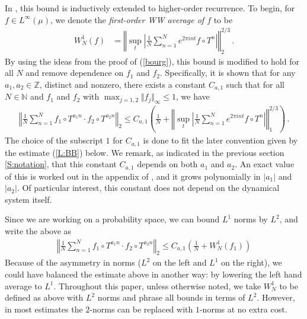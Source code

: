 \documentclass[11pt, oneside]{amsart}   	%
\newcommand{\1}{\mathbbm{1}}
\theoremstyle{definition}
\begin{document}
In \cite{assani2024higherorderwienerwintnersystems}, this bound is inductively extended to higher-order recurrence. To begin, for $f\in L^\infty(\mu)$, we denote the \textit{first-order WW average of $f$} to be
\begin{align*}
W^1_N(f) &= \left\Vert \sup_{t}\left| \frac{1}{N}\sum_{n=1}^N e^{2\pi i n t} f\circ T^n \right| \right\Vert_2^{2/3} \, .
\end{align*}
By using the ideas from the proof of (\ref{bourg}), this bound is modified to hold for all $N$ and remove dependence on $f_1$ and $f_2$. Specifically, it is shown that for any $a_1, a_2\in \mathbb{Z}$, distinct and nonzero, there exists a constant $C_{a, 1}$ such that for all $N\in \mathbb{N}$ and $f_1$ and $f_2$ with $\max_{j=1, 2} \Vert f_j \Vert_{\infty} \leq 1$, we have 
\begin{align*}
\left\Vert \frac{1}{N}\sum_{n=1}^N f_1 \circ T^{a_1n} \cdot f_2 \circ T^{a_2n} \right\Vert_2 \leq C_{a, 1} \left( \frac{1}{N} +\left\Vert\sup_t \left|\frac{1}{N}\sum_{n=1}^N e^{2\pi i n t} f\circ T^n \right| \right\Vert_1^{2/3}\right) \, .
\end{align*}
The choice of the subscript $1$ for $C_{a, 1}$ is done to fit the later convention given by the estimate (\ref{L:BB}) below. We remark, as indicated in the previous section \ref{S:notation}, that this constant $C_{a, 1}$ depends on both $a_1$ and $a_2$. An exact value of this is worked out in the appendix of \cite{assani2024higherorderwienerwintnersystems}, and it grows polynomially in $|a_1|$ and $|a_2|$. Of particular interest, this constant does not depend on the dynamical system itself.    

Since we are working on a probability space, we can bound $L^1$ norms by $L^2$, and write the above as
\begin{align*}
\left\Vert \frac{1}{N}\sum_{n=1}^N f_1 \circ T^{a_1n} \cdot f_2 \circ T^{a_2n} \right\Vert_2 \leq C_{a, 1} \left( \frac{1}{N} + W^1_N(f_1)\right)
\end{align*}
Because of the asymmetry in norms ($L^2$ on the left and $L^1$ on the right), we could have balanced the estimate above in another way: by lowering the left hand average to $L^1$. Throughout this paper, unless otherwise noted, we take $W_N^1$ to be defined as above with $L^2$ norms and phrase all bounds in terms of $L^2$. However, in most estimates the $2$-norms can be replaced with $1$-norms at no extra cost.
\end{document}
